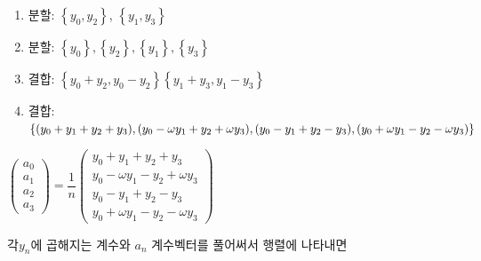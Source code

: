 \documentclass{oblivoir}
\begin{document}
\begin{enumerate}
    \item 분할: $\left\{y_0, y_2 \right\}$, $\left\{y_1, y_3\right\}$
    \item 분할: $\left\{y_0\right\}, \left\{y_2\right\}, \left\{y_1\right\}, \left\{y_3\right\}$
    \item 결합: $\left\{y_0 + y_2, y_0 - y_2 \right\}\left\{y_1 + y_3, y_1 - y_3\right\}$
    \item 결합: $\left\{(y_0 +y_1 + y_2 + y_3), (y_0 - \omega y_1 + y_2 +\omega y_3) , \\(y_0 - y_1 +y_2 - y_3), (y_0 + \omega y_1 - y_2 - \omega y_3) \right\}$
\end{enumerate}

$
\begin{pmatrix}
    a_0 \\ 
    a_1 \\
    a_2 \\
    a_3 
\end{pmatrix}
= \dfrac{1}{n}
\begin{pmatrix}
    y_0 + y_1 + y_2 + y_3 \\ 
    y_0 - \omega y_1 - y_2 +\omega y_3 \\
    y_0 - y_1 + y_2 - y_3 \\
    y_0 + \omega y_1 - y_2 - \omega y_3
\end{pmatrix}
$


각$y_n$에 곱해지는 계수와 $a_n$ 계수벡터를 풀어써서 행렬에 나타내면
\end{document}
